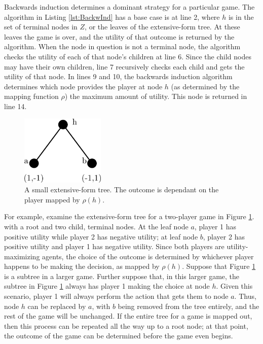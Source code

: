 Backwards induction determines a dominant strategy for a particular game. The algorithm in Listing \ref{lst:BackwInd} has a base case is at line 2, where $h$ is in the set of terminal nodes in $Z$, or the leaves of the extensive-form tree. At these leaves the game is over, and the utility of that outcome is returned by the algorithm. When the node in question is not a terminal node, the algorithm checks the utility of each of that node's children at line 6. Since the child nodes may have their own children, line 7 recursively checks each child and gets the utility of that node. In lines 9 and 10, the backwards induction algorithm determines which node provides the player at node $h$ (as determined by the mapping function $\rho$) the maximum amount of utility. This node is returned in line 14.\\

\begin{figure}[H]
  \centering
  \includegraphics[width=4cm]{figures/ExampleBackwardInduction.png}
  \caption{A small extensive-form tree. The outcome is dependant on the player mapped by $\rho(h)$.}
  \label{fig:BackwardInduction}
\end{figure}
For example, examine the extensive-form tree for a two-player game in Figure \ref{fig:BackwardInduction}. with a root and two child, terminal nodes. At the leaf node $a$, player 1 has positive utility while player 2 has negative utility; at leaf node $b$, player 2 has positive utility and player 1 has negative utility. Since both players are utility-maximizing agents, the choice of the outcome is determined by whichever player happens to be making the decision, as mapped by $\rho(h)$. Suppose that Figure \ref{fig:BackwardInduction} is a subtree in a larger game. Further suppose that, in this larger game, the subtree in Figure \ref{fig:BackwardInduction} always has player 1 making the choice at node $h$. Given this scenario, player 1 will always perform the action that gets them to node $a$. Thus, node $h$ can be replaced by $a$, with $b$ being removed from the tree entirely, and the rest of the game will be unchanged. If the entire tree for a game is mapped out, then this process can be repeated all the way up to a root node; at that point, the outcome of the game can be determined before the game even begins.